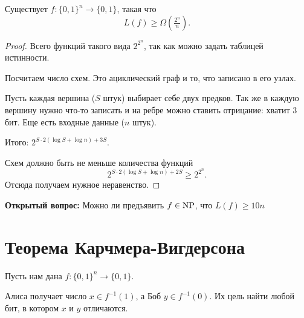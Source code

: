 \begin{thm}[Шеннон]
	Существует $ f \colon \{0, 1\}^{n} \to  \{0, 1\}$, такая что 
	$$ L(f) \ge \Omega\left( \tfrac{2^{n}}{n} \right) .$$
\end{thm}
\begin{proof}
    Всего функций такого вида $ 2^{2^{n}}$, так как можно задать таблицей истинности.

	Посчитаем число схем. Это ациклический граф и то, что записано в его узлах.

	Пусть каждая вершина ($ S$ штук) выбирает себе двух предков. Так же в каждую вершину нужно что-то записать и на ребре можно ставить отрицание: хватит $ 3$ бит. Еще есть входные данные ($ n$ штук).

	Итого: $2^{ S \cdot 2 (\log S + \log n) + 3S}$.

	Схем должно быть не меньше  количества функций
	\[
		2^{S \cdot  2( \log S + \log n) + 2 S} \ge  2^{2^n}
	.\] 
	Отсюда получаем нужное неравенство.
\end{proof}

\textbf{Открытый вопрос:} Можно ли предъявить $ f \in \operatorname{NP}$, что $ L(f) \ge  10n$

\section{Теорема Карчмера-Вигдерсона}

Пусть нам дана $ f\colon \{0, 1\}^{n } \to  \{0, 1\}$.

Алиса получает число $ x \in f^{-1}(1)$, а Боб $ y \in f^{-1}(0)$. Их цель найти любой бит, в котором $x$ и $y$ отличаются.


